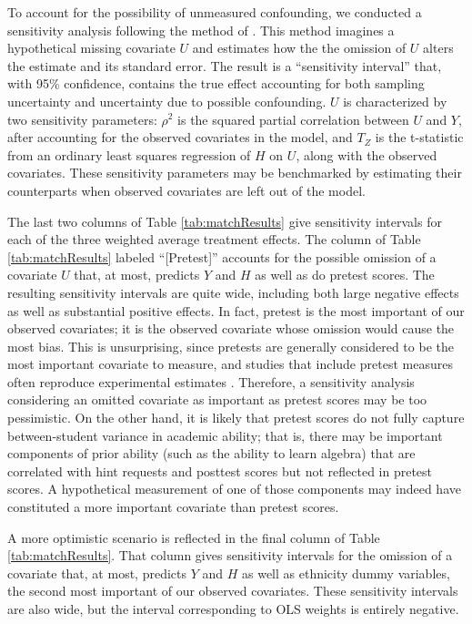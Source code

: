 \documentclass{article}\usepackage[]{graphicx}\usepackage[]{color}
\begin{document}
To account for the possibility of unmeasured confounding, we conducted
a sensitivity analysis following the method of \citet{hhh}.
This method imagines a hypothetical missing covariate $U$ and estimates
how the the omission of $U$ alters the estimate
and its standard error.
The result is a ``sensitivity interval'' \citep[c.f.][]{rosenbaum2002observational} that,
with 95\% confidence, contains the true effect accounting for both
sampling uncertainty and uncertainty due to possible confounding.
$U$ is characterized by two sensitivity parameters:
$\rho^2$ is the squared partial correlation between $U$ and $Y$, after
accounting for the observed covariates in the model, and $T_Z$ is the
t-statistic from an ordinary least squares regression of $H$ on $U$, along with the observed covariates.
These sensitivity parameters may be benchmarked by estimating their
counterparts when observed covariates are left out of the model.

The last two columns of Table \ref{tab:matchResults} give sensitivity intervals for each of the three weighted average treatment effects.
The column of Table \ref{tab:matchResults} labeled ``[Pretest]''
accounts for the possible omission of a covariate $U$ that, at most, predicts $Y$ and $H$ as well as do pretest scores.
The resulting sensitivity intervals are quite wide, including
both large negative effects as well as substantial positive
effects.
In fact, pretest is the most important of our observed covariates; it is the observed covariate whose omission would cause the most bias.
This is unsurprising, since pretests are generally considered to be the most important covariate to measure, and studies that include pretest measures often reproduce experimental estimates \citep[e.g.][]{cook2008three,cook2009bias}.
Therefore, a sensitivity analysis considering an omitted covariate as important as pretest scores may be too pessimistic.
On the other hand, it is likely that pretest scores do not fully capture between-student variance in academic ability; that is, there may be important components of prior ability (such as the ability to learn algebra) that are correlated with hint requests and posttest scores but not reflected in pretest scores.
A hypothetical measurement of one of those components may indeed have constituted a more important covariate than pretest scores.

A more optimistic scenario is reflected in the final column of Table \ref{tab:matchResults}.
That column gives sensitivity intervals for the omission of a covariate that, at most, predicts $Y$ and $H$ as well as ethnicity dummy variables, the second most important of our observed covariates.
These sensitivity intervals are also wide, but the interval corresponding
to OLS weights is entirely negative.
\end{document}
